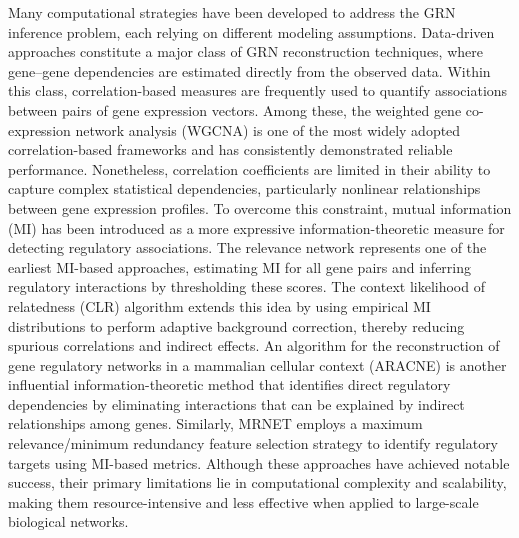Many computational strategies have been developed to address the GRN inference problem, each relying on different modeling assumptions. Data-driven approaches constitute a major class of GRN reconstruction techniques, where gene–gene dependencies are estimated directly from the observed data. Within this class, correlation-based measures are frequently used to quantify associations between pairs of gene expression vectors. Among these, the weighted gene co-expression network analysis (WGCNA) \parencite{Zhang2005} is one of the most widely adopted correlation-based frameworks and has consistently demonstrated reliable performance. Nonetheless, correlation coefficients are limited in their ability to capture complex statistical dependencies, particularly nonlinear relationships between gene expression profiles. To overcome this constraint, mutual information (MI) has been introduced as a more expressive information-theoretic measure for detecting regulatory associations. The relevance network \parencite{Butte2000} represents one of the earliest MI-based approaches, estimating MI for all gene pairs and inferring regulatory interactions by thresholding these scores. The context likelihood of relatedness (CLR) algorithm \parencite{faith2007} extends this idea by using empirical MI distributions to perform adaptive background correction, thereby reducing spurious correlations and indirect effects. An algorithm for the reconstruction of gene regulatory networks in a mammalian cellular context (ARACNE) \parencite{Zoppoli2010} is another influential information-theoretic method that identifies direct regulatory dependencies by eliminating interactions that can be explained by indirect relationships among genes. Similarly, MRNET \parencite{Meyer2007} employs a maximum relevance/minimum redundancy feature selection strategy to identify regulatory targets using MI-based metrics. Although these approaches have achieved notable success, their primary limitations lie in computational complexity and scalability, making them resource-intensive and less effective when applied to large-scale biological networks.

